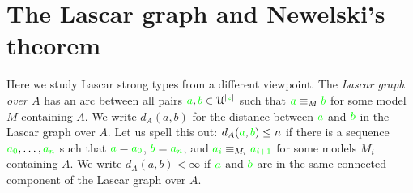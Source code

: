 \documentclass[creche.tex]{subfiles}
\begin{document}
\begin{comment}
\begin{proposition}\label{prop_exisntence_coheirs_over_sets}
Assume $A$ is a coheir extension base. Then every type $q({\mr x})\subseteq L(\U)$ almost satisfiable in $A$ has an extension to a global type almost satisfiable in $A$.
\end{proposition}

\begin{proof} 
As in the proof of Proposition~\ref{prop_exisntence_coheirs}. Let $p({\mr x})\subseteq L(\U)$ be maximal among the types containing $q({\mr x})$ and finitely satisfiable in $A$. We prove that $p({\mr x})$ is complete. If for a contradiction that $p({\mr x})$ contains neither $\psi({\mr x})$ nor $\neg\psi({\mr x})$. Then for some formula $\psi({\mr x})\in p$ neither $\psi({\mr x})\cup\big\{\psi({\mr x})\big\}$ nor $\psi({\mr x})\cup\big\{\neg\psi({\mr x})\big\}$ is finitely satisfiable in $A$. The disjunction of these two formulas is $\psi({\mr x})$. So, this contradicts the finite satisfiability of $p({\mr x})$.
\end{proof}



\end{comment}


\section{The Lascar graph and Newelski's theorem}

Here we study Lascar strong types from a different viewpoint. The \emph{Lascar graph over $A$\/} has an arc between all pairs ${\color{green} a},{\color{green} b}\in \EuScript U^{|{\color{green} z}|}$ such that  ${\color{green} a}\equiv_M{\color{green} b}$ for some model $M$ containing $A$. We write \emph{$d_A(a,b)$\/} for the distance between ${\color{green} a}$ and ${\color{green} b}$ in the Lascar graph over $A$. Let us spell this out: $d_A({\color{green} a},{\color{green} b})\le n$ if there is a sequence ${\color{green} a_0},\dots,{\color{green} a_n}$ such that ${\color{green} a}={\color{green} a_0}$, ${\color{green} b}={\color{green} a_n}$, and ${\color{green} a_i}\equiv_{M_i}{\color{green} a_{i+1}}$ for some models $M_i$ containing $A$. We write \emph{$d_A(a,b)<\infty$\/} if ${\color{green} a}$ and ${\color{green} b}$ are in the same connected component of the Lascar graph over $A$.
\end{document}
